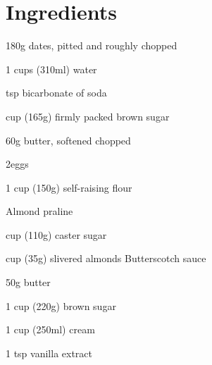 \section*{Ingredients}
\begin{ingredients-list}
	\item 180g dates, pitted and roughly chopped
	\item 1 cups (310ml) water
	\item {} tsp bicarbonate of soda
	\item {} cup (165g) firmly packed brown sugar
	\item 60g butter, softened chopped
	\item 2eggs
	\item 1 cup (150g) self-raising flour
\end{ingredients-list}
Almond praline
\begin{ingredients-list}
	\item {} cup (110g) caster sugar
	\item {} cup (35g) slivered almonds Butterscotch sauce
	\item 50g butter
	\item 1 cup (220g) brown sugar
	\item 1 cup (250ml) cream
	\item 1 tsp vanilla extract
\end{ingredients-list}

